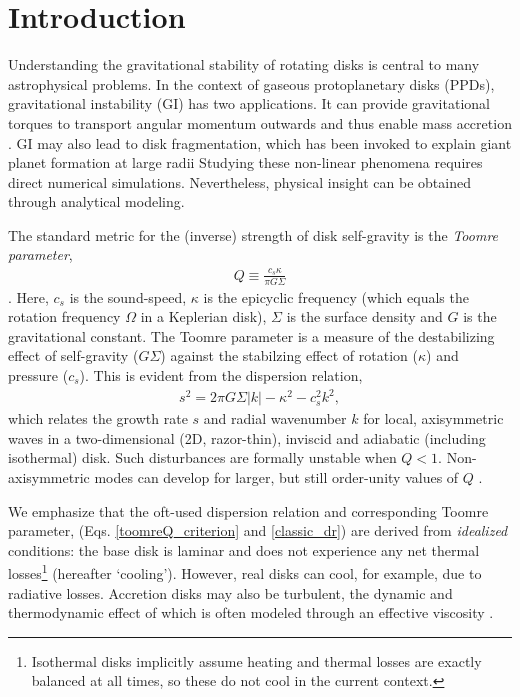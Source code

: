 \documentclass[iop, numberedappendix]{emulateapj}
\begin{document}
\section{Introduction}\label{intro} 
Understanding the gravitational stability of rotating disks    
is central to many astrophysical problems. In the context of 
gaseous protoplanetary disks (PPDs), gravitational instability (GI)
has two applications. It can provide gravitational torques to
transport angular momentum outwards and thus enable mass accretion
\citep{armitage10,turner14}. GI may also lead to disk fragmentation,
which has been invoked to explain giant planet formation at large
radii \citep{boss97,helled14} %
Studying these non-linear phenomena requires
direct numerical simulations. Nevertheless, physical insight can be    
obtained through analytical modeling. 

The standard metric for the (inverse) strength of disk self-gravity is
the \emph{Toomre parameter}, 
\begin{align}\label{toomreQ_criterion}
  Q \equiv \frac{c_s\kappa}{\pi G \Sigma}  
\end{align}
\citep{toomre64}. Here, $c_s$ is the sound-speed,
$\kappa$ is the epicyclic frequency (which equals the rotation
frequency $\Omega$ in a Keplerian disk), $\Sigma$ is the surface
density and $G$ is the gravitational constant. The Toomre parameter is a
measure of the destabilizing effect of self-gravity ($G\Sigma$) against 
the stabilzing effect of rotation ($\kappa$) and pressure 
($c_s$). This is evident from the dispersion relation, 
\begin{align}\label{classic_dr}
  s^2 =  2\pi G\Sigma|k| - \kappa^2 - c_s^2k^2,   
\end{align}
which relates the growth rate $s$ and radial wavenumber $k$ for local,
axisymmetric waves in a two-dimensional (2D, razor-thin), inviscid and
adiabatic (including isothermal) disk. Such disturbances are formally
unstable when $Q<1$. Non-axisymmetric modes can develop for larger,
but still order-unity values of $Q$
\citep{lau_bertin78,papaloizou89,papaloizou91}. 

We emphasize that the oft-used dispersion relation and corresponding Toomre parameter, %
(Eqs. \ref{toomreQ_criterion} and \ref{classic_dr}) are derived from \emph{idealized} conditions: 
the base disk is laminar and does not experience any net thermal
losses\footnote{Isothermal disks implicitly assume  
  heating and thermal losses are exactly balanced at all 
  times, so these do not cool in the current context.} 
(hereafter `cooling').  
However, real disks can cool, for example, %
due to radiative losses. Accretion disks may also be turbulent, the dynamic and thermodynamic effect of which is often modeled through an
effective viscosity \citep{shakura73,lin87,armitage01,rafikov15}. 
\end{document}
